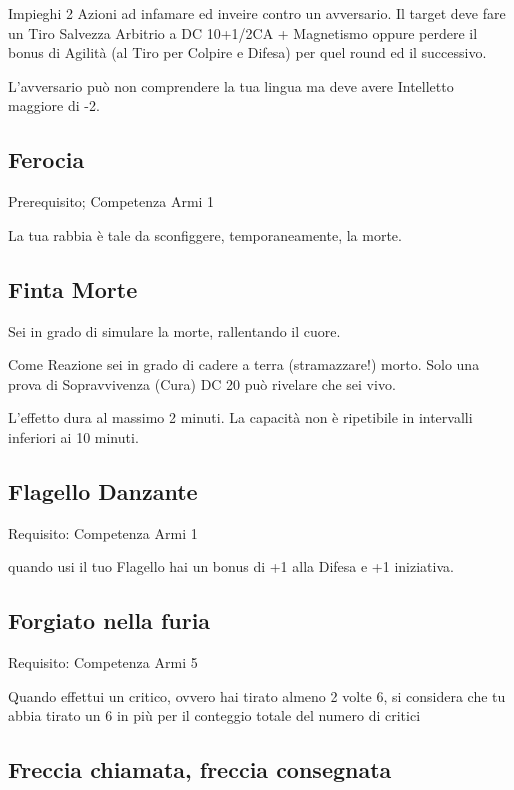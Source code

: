 \documentclass[a4paper,11pt,twoside,openany]{book}
\begin{document}
Impieghi 2 Azioni ad infamare ed inveire contro un avversario. Il target deve fare un Tiro Salvezza Arbitrio a DC 10+1/2CA + Magnetismo oppure perdere il bonus di Agilità (al Tiro per Colpire e Difesa) per quel round ed il successivo.

L'avversario può non comprendere la tua lingua ma deve avere Intelletto maggiore di -2.

\subsection{Ferocia}

Prerequisito; Competenza Armi 1

La tua rabbia è tale da sconfiggere, temporaneamente, la morte.

\subsection{Finta Morte}

Sei in grado di simulare la morte, rallentando il cuore.

Come Reazione sei in grado di cadere a terra (stramazzare!) morto. Solo una prova di Sopravvivenza (Cura) DC 20 può rivelare che sei vivo.

L'effetto dura al massimo 2 minuti. La capacità non è ripetibile in intervalli inferiori ai 10 minuti.

\subsection{Flagello Danzante}

Requisito: Competenza Armi 1

quando usi il tuo Flagello hai un bonus di +1 alla Difesa e +1 iniziativa.

\subsection{Forgiato nella furia}

Requisito: Competenza Armi 5

Quando effettui un critico, ovvero hai tirato almeno 2 volte 6, si considera che tu abbia tirato un 6 in più per il conteggio totale del numero di critici

\subsection{Freccia chiamata, freccia consegnata}
\end{document}
